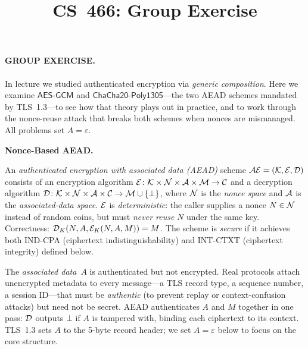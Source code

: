 \documentclass[11pt]{article}
\title{CS~466: Group Exercise}
\date{}
\newcommand{\calA}{{\cal A}}
\newcommand{\calC}{{\cal C}}
\newcommand{\calK}{{\cal K}}
\newcommand{\calM}{{\cal M}}
\newcommand{\calD}{{\cal D}}
\newcommand{\calE}{{\cal E}}
\newcommand{\calN}{{\cal N}}
\newcommand{\AESGCM}{\mathsf{AES\text{-}GCM}}
\newcommand{\CCP}{\mathsf{ChaCha20\text{-}Poly1305}}
\begin{document}
\maketitle

\thispagestyle{fancy}

\paragraph*{GROUP EXERCISE.}

\bigskip
\noindent
In lecture we studied authenticated encryption via \emph{generic
composition}.
Here we examine $\AESGCM$ and $\CCP$---the two AEAD schemes mandated
by TLS~1.3---to see how that theory plays out in practice, and to work
through the nonce-reuse attack that breaks both schemes when nonces are
mismanaged.
All problems set $A = \varepsilon$.

\bigskip


\noindent\textbf{Nonce-Based AEAD.}\quad
\begin{sloppypar}
An \emph{authenticated encryption with associated data (AEAD)}
scheme $\mathcal{AE} = (\calK, \calE, \calD)$ consists of an
encryption algorithm
$\calE \colon \calK \times \calN \times \calA \times \calM \to \calC$
and a decryption algorithm
$\calD \colon \calK \times \calN \times \calA \times \calC \to \calM \cup \{\bot\}$,
where $\calN$ is the \emph{nonce space} and $\calA$ is the
\emph{associated-data space}.
$\calE$ is \emph{deterministic}: the caller supplies a nonce
$N \in \calN$ instead of random coins, but must \emph{never reuse}
$N$ under the same key.
Correctness: $\calD_K(N, A, \calE_K(N, A, M)) = M$.
The scheme is \emph{secure} if it achieves both IND-CPA
(ciphertext indistinguishability) and INT-CTXT (ciphertext integrity) defined below.
\end{sloppypar}

The \emph{associated data}~$A$ is authenticated but not encrypted.
Real protocols attach unencrypted metadata to every message---a TLS
record type, a sequence number, a session ID---that must be
\emph{authentic} (to prevent replay or context-confusion attacks) but
need not be secret.
AEAD authenticates $A$ and $M$ together in one pass: $\calD$ outputs
$\bot$ if $A$ is tampered with, binding each ciphertext to its context.
TLS~1.3 sets $A$ to the 5-byte record header; we set $A=\varepsilon$
below to focus on the core structure.
\end{document}
